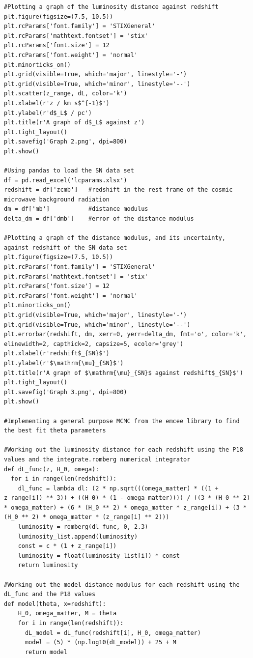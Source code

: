 \documentclass[12pt, a4paper]{article}
\begin{document}
\begin{verbatim}
#Plotting a graph of the luminosity distance against redshift
plt.figure(figsize=(7.5, 10.5))
plt.rcParams['font.family'] = 'STIXGeneral'
plt.rcParams['mathtext.fontset'] = 'stix'
plt.rcParams['font.size'] = 12
plt.rcParams['font.weight'] = 'normal'
plt.minorticks_on()
plt.grid(visible=True, which='major', linestyle='-')
plt.grid(visible=True, which='minor', linestyle='--')
plt.scatter(z_range, dL, color='k')
plt.xlabel(r'z / km s$^{-1}$')
plt.ylabel(r'd$_L$ / pc')
plt.title(r'A graph of d$_L$ against z')
plt.tight_layout()
plt.savefig('Graph 2.png', dpi=800)
plt.show()

#Using pandas to load the SN data set
df = pd.read_excel('lcparams.xlsx')
redshift = df['zcmb']   #redshift in the rest frame of the cosmic microwave background radiation
dm = df['mb']           #distance modulus
delta_dm = df['dmb']    #error of the distance modulus

#Plotting a graph of the distance modulus, and its uncertainty, against redshift of the SN data set
plt.figure(figsize=(7.5, 10.5))
plt.rcParams['font.family'] = 'STIXGeneral'
plt.rcParams['mathtext.fontset'] = 'stix'
plt.rcParams['font.size'] = 12
plt.rcParams['font.weight'] = 'normal'
plt.minorticks_on()
plt.grid(visible=True, which='major', linestyle='-')
plt.grid(visible=True, which='minor', linestyle='--')
plt.errorbar(redshift, dm, xerr=0, yerr=delta_dm, fmt='o', color='k', elinewidth=2, capthick=2, capsize=5, ecolor='grey')
plt.xlabel(r'redshift$_{SN}$')
plt.ylabel(r'$\mathrm{\mu}_{SN}$')
plt.title(r'A graph of $\mathrm{\mu}_{SN}$ against redshift$_{SN}$')
plt.tight_layout()
plt.savefig('Graph 3.png', dpi=800)
plt.show()

#Implementing a general purpose MCMC from the emcee library to find the best fit theta parameters

#Working out the luminosity distance for each redshift using the P18 values and the integrate.romberg numerical integrator
def dL_func(z, H_0, omega):
  for i in range(len(redshift)):
    dl_func = lambda dl: (2 * np.sqrt(((omega_matter) * ((1 + z_range[i]) ** 3)) + ((H_0) * (1 - omega_matter)))) / ((3 * (H_0 ** 2) * omega_matter) + (6 * (H_0 ** 2) * omega_matter * z_range[i]) + (3 * (H_0 ** 2) * omega_matter * (z_range[i] ** 2)))
    luminosity = romberg(dl_func, 0, 2.3)
    luminosity_list.append(luminosity)
    const = c * (1 + z_range[i])
    luminosity = float(luminosity_list[i]) * const
    return luminosity

#Working out the model distance modulus for each redshift using the dL_func and the P18 values
def model(theta, x=redshift):
    H_0, omega_matter, M = theta
    for i in range(len(redshift)):
      dL_model = dL_func(redshift[i], H_0, omega_matter)
      model = (5) * (np.log10(dL_model)) + 25 + M
      return model


\end{verbatim}
\end{document}
